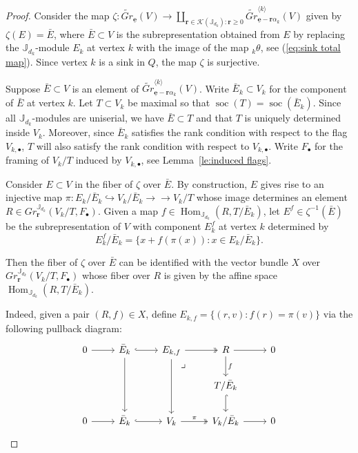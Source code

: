 \documentclass{amsart}
\numberwithin{equation}{section}
\theoremstyle{definition}
\def\JJ{\mathbb{J}}
\def\ubfe{{\underline{\mathbf{e}}}}
\def\bfr{\mathbf{r}}
\def\cK{\mathcal{K}}
\def\Hom{\operatorname{Hom}}
\def\soc{\operatorname{soc}}
\newcommand{\into}{\hookrightarrow}
\newcommand{\onto}{\to\!\!\!\!\!\to}
\renewcommand{\eqref}[1]{{\rm (\ref{#1})}}
\begin{document}
\begin{proof}
  Consider the map $\zeta:\widetilde{Gr}_\ubfe(V)\to\coprod\limits_{\bfr\in\cK(\JJ_{d_k}):\bfr\ge0} \widetilde{Gr}^{\langle k\rangle}_{\ubfe-\bfr\alpha_k}(V)$ given by $\zeta(E)=\bar{E}$, where $\bar{E}\subset V$ is the subrepresentation obtained from $E$ by replacing the $\JJ_{d_k}$-module $E_k$ at vertex $k$ with the image of the map ${}_k\theta$, see \eqref{eq:sink total map}.  Since vertex $k$ is a sink in $Q$, the map $\zeta$ is surjective.

  Suppose $\bar{E}\subset V$ is an element of $\widetilde{Gr}_{\ubfe-\bfr\alpha_k}^{\langle k\rangle}(V)$.  
  Write $\bar{E}_k\subset V_k$ for the component of $\bar{E}$ at vertex $k$.  
  Let $T\subset V_k$ be maximal so that $\soc(T)=\soc(\bar{E}_k)$.  
  Since all $\JJ_{d_k}$-modules are uniserial, we have $\bar{E}\subset T$ and that $T$ is uniquely determined inside $V_k$.  
  Moreover, since $\bar{E}_k$ satisfies the rank condition with respect to the flag $V_{k,\bullet}$, $T$ will also satisfy the rank condition with respect to $V_{k,\bullet}$.  
  Write $F_\bullet$ for the framing of $V_k/T$ induced by $V_{k,\bullet}$, see Lemma~\ref{le:induced flags}.  

  Consider $E\subset V$ in the fiber of $\zeta$ over $\bar{E}$.  
  By construction, $E$ gives rise to an injective map $\pi:E_k/\bar{E}_k\into V_k/\bar{E}_k\onto V_k/T$ whose image determines an element $R\in Gr_\bfr^{\JJ_{d_k}}(V_k/T,F_\bullet)$.  
  Given a map $f\in\Hom_{\JJ_{d_k}}(R,T/\bar{E}_k)$, let $E^f\in\zeta^{-1}(\bar{E})$ be the subrepresentation of $V$ with component $E^f_k$ at vertex $k$ determined by
  \[E^f_k/\bar{E}_k=\{x+f(\pi(x)):x\in E_k/\bar{E}_k\}.\]

  Then the fiber of $\zeta$ over $\bar{E}$ can be identified with the vector bundle $X$ over $Gr_\bfr^{\JJ_{d_k}}(V_k/T,F_\bullet)$ whose fiber over $R$ is given by the affine space $\Hom_{\JJ_{d_k}}(R,T/\bar{E}_k)$.

  Indeed, given a pair $(R,f)\in X$, define $E_{k,f}=\{(r,v):f(r)=\pi(v)\}$ via the following pullback diagram:
  \[\begin{tikzcd}
      0\arrow{r} & \bar{E}_k\arrow[hook]{r}\arrow{dd} & E_{k,f}\arrow{dd}\arrow[two heads]{r}\arrow[ddr, phantom, "\lrcorner", very near start] & R\arrow["f"]{d}\arrow{r} & 0\\
       & & & T/\bar{E}_k\arrow[hook]{d} & \\
      0\arrow{r} & \bar{E}_k\arrow[hook]{r} & V_k\arrow[two heads, "\pi"]{r}& V_k/\bar{E}_k\arrow{r} & 0
    \end{tikzcd}\]



\end{proof}
\end{document}
